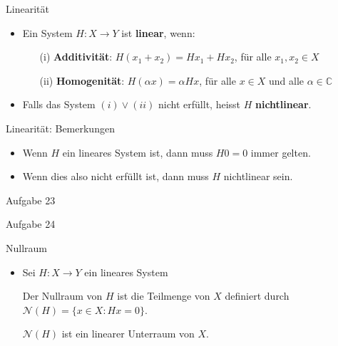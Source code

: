 \documentclass[14pt, aspectratio=169, handout]{beamer}
\begin{document}
\begin{frame}{Linearität}
    \begin{itemize}
        \item Ein System $H:X \to Y$ ist \textbf{linear}, wenn:
        \item[] \begin{itemize}
            \item[] 
            \item[(i)] \textbf{Additivität}: $H(x_1 + x_2) = Hx_1 + Hx_2$, für alle $x_1,x_2 \in X$
            \item[] 
            \item[(ii)] \textbf{Homogenität}: $H(\alpha x) = \alpha H x$, für alle $x\in X$ und alle $\alpha \in \mathbb{C}$
        \end{itemize}
        \item[]  
        \item Falls das System $(i) \lor (ii)$ nicht erfüllt, heisst $H$ \textbf{nichtlinear}.
    \end{itemize}  
\end{frame}

\begin{frame}{Linearität: Bemerkungen}
    \begin{itemize}
        \item Wenn $H$ ein lineares System ist, dann muss $H0 = 0$ immer gelten.
        \item[] 
        \item Wenn dies also nicht erfüllt ist, dann muss $H$ nichtlinear sein.
    \end{itemize}
\end{frame}

\begin{frame}{Aufgabe 23}
    
\end{frame}

\begin{frame}{Aufgabe 24}
    
\end{frame}

\begin{frame}{Nullraum}
    \begin{itemize}
        \item Sei $H:X \to Y$ ein lineares System
        \item[] 
        \item[] Der Nullraum von $H$ ist die Teilmenge von $X$ definiert durch $\mathcal{N}(H) = \{x \in X : Hx = 0\}$.
        \item[] 
        \item[] $\mathcal{N}(H)$ ist ein linearer Unterraum von $X$.
        \item[] 
        \item[] 
        \item[] 
    \end{itemize}
\end{frame}
\end{document}
